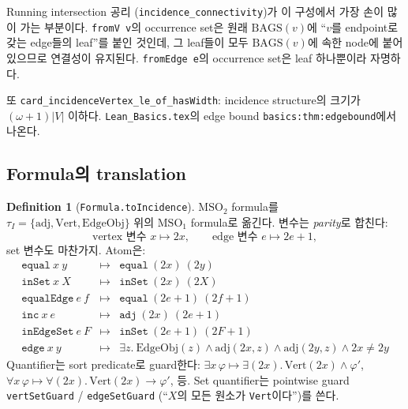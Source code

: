 \documentclass[11pt]{article}
\theoremstyle{definition}
\newtheorem{definition}{Definition}[section]
\theoremstyle{plain}
\newcommand{\MSOtwo}{\mathrm{MSO}_2}
\newcommand{\MSOone}{\mathrm{MSO}_1}
\newcommand{\lean}[1]{\texttt{#1}}
\newcommand{\leanfile}[1]{\texttt{#1}}
\newcommand{\BAGS}{\mathrm{BAGS}}
\begin{document}
Running intersection 공리 (\lean{incidence\_connectivity})가 이 구성에서
가장 손이 많이 가는 부분이다. \lean{fromV v}의 occurrence set은 원래
$\BAGS(v)$에 ``$v$를 endpoint로 갖는 edge들의 leaf''를 붙인 것인데, 그 leaf들이
모두 $\BAGS(v)$에 속한 node에 붙어 있으므로 연결성이 유지된다.
\lean{fromEdge e}의 occurrence set은 leaf 하나뿐이라 자명하다.

또 \lean{card\_incidenceVertex\_le\_of\_hasWidth}: incidence structure의 크기가
$(\omega+1)|V|$ 이하다. \leanfile{Lean\_Basics.tex}의 edge bound
\lean{basics:thm:edgebound}에서 나온다.

\subsection{Formula의 translation}

\begin{definition}[\lean{Formula.toIncidence}]
\label{mso:def:toincidence}
$\MSOtwo$ formula를 $\tau_I = \{\mathrm{adj}, \mathrm{Vert}, \mathrm{EdgeObj}\}$
위의 $\MSOone$ formula로 옮긴다. 변수는 \emph{parity}로 합친다:
\[
  \text{vertex 변수 } x \mapsto 2x, \qquad
  \text{edge 변수 } e \mapsto 2e+1,
\]
set 변수도 마찬가지. Atom은:
\[
\begin{array}{lcl}
  \lean{equal}\ x\ y &\mapsto& \lean{equal}\ (2x)\ (2y) \\
  \lean{inSet}\ x\ X &\mapsto& \lean{inSet}\ (2x)\ (2X) \\
  \lean{equalEdge}\ e\ f &\mapsto& \lean{equal}\ (2e{+}1)\ (2f{+}1) \\
  \lean{inc}\ x\ e &\mapsto& \lean{adj}\ (2x)\ (2e{+}1) \\
  \lean{inEdgeSet}\ e\ F &\mapsto& \lean{inSet}\ (2e{+}1)\ (2F{+}1) \\
  \lean{edge}\ x\ y &\mapsto& \exists z.\ \mathrm{EdgeObj}(z) \land \mathrm{adj}(2x, z) \land \mathrm{adj}(2y, z) \land 2x \ne 2y
\end{array}
\]
Quantifier는 sort predicate로 guard한다: $\exists x\,\varphi \mapsto \exists (2x).\,\mathrm{Vert}(2x) \land \varphi'$,
$\forall x\,\varphi \mapsto \forall (2x).\,\mathrm{Vert}(2x) \to \varphi'$, 등.
Set quantifier는 pointwise guard \lean{vertSetGuard} / \lean{edgeSetGuard}
(``$X$의 모든 원소가 \lean{Vert}이다'')를 쓴다.
\end{definition}
\end{document}
